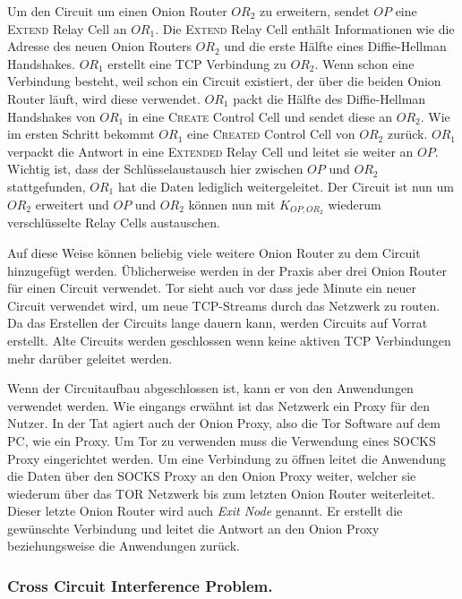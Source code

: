 \documentclass[fleqn,envcountsame,runningheads,10pt,a4paper]{llncs}
\begin{document}
Um den Circuit um einen Onion Router $\textit{OR}_2$ zu erweitern,  sendet $\textit{OP}$ eine \textsc{Extend} Relay Cell an $\textit{OR}_1$. Die \textsc{Extend} Relay Cell enthält Informationen wie die Adresse des neuen Onion Routers $\textit{OR}_2$ und die erste Hälfte eines Diffie-Hellman Handshakes. $\textit{OR}_1$ erstellt eine TCP Verbindung zu $\textit{OR}_2$. Wenn schon eine Verbindung besteht, weil schon ein Circuit existiert, der über die beiden Onion Router läuft, wird diese verwendet. $\textit{OR}_1$ packt die Hälfte des Diffie-Hellman Handshakes von $\textit{OR}_1$ in eine \textsc{Create} Control Cell und sendet diese an $\textit{OR}_2$. Wie im ersten Schritt bekommt $\textit{OR}_1$ eine \textsc{Created} Control Cell von $\textit{OR}_2$ zurück. $\textit{OR}_1$ verpackt die Antwort in eine \textsc{Extended} Relay Cell und leitet sie weiter an $\textit{OP}$. Wichtig ist, dass der Schlüsselaustausch hier zwischen  $\textit{OP}$ und $\textit{OR}_2$ stattgefunden, $\textit{OR}_1$ hat die Daten lediglich weitergeleitet. Der Circuit ist nun um $\textit{OR}_2$ erweitert und $\textit{OP}$ und $\textit{OR}_2$ können nun mit $K_{OP,OR_2}$ wiederum verschlüsselte Relay Cells austauschen. 

Auf diese Weise können beliebig viele weitere Onion Router zu dem Circuit hinzugefügt werden. Üblicherweise werden in der Praxis aber drei Onion Router für einen Circuit verwendet. Tor sieht auch vor dass jede Minute ein neuer Circuit verwendet wird, um neue TCP-Streams durch das Netzwerk zu routen. Da das Erstellen der Circuits lange dauern kann, werden Circuits auf Vorrat erstellt. Alte Circuits werden geschlossen wenn keine aktiven TCP Verbindungen mehr darüber geleitet werden.

Wenn der Circuitaufbau abgeschlossen ist, kann er von den Anwendungen verwendet werden. Wie eingangs erwähnt ist das Netzwerk ein Proxy für den Nutzer. In der Tat agiert auch der Onion Proxy, also die Tor Software auf dem PC, wie ein Proxy. Um Tor zu verwenden muss die Verwendung eines SOCKS Proxy\cite{rfc:socks} eingerichtet werden. Um eine Verbindung zu öffnen leitet die Anwendung die Daten über den SOCKS Proxy an den Onion Proxy weiter, welcher sie wiederum über das TOR Netzwerk bis zum letzten Onion Router weiterleitet. Dieser letzte Onion Router wird auch \textit{Exit Node} genannt. Er erstellt die gewünschte Verbindung und leitet die Antwort an den Onion Proxy beziehungsweise die Anwendungen zurück.

\subsubsection{Cross Circuit Interference Problem.}
\label{sec:crosscircuitinterference} 
\end{document}
